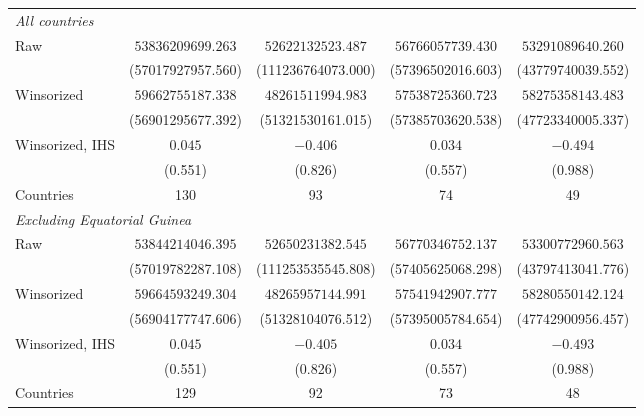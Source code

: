 \begin{table}[htbp]
\begin{tabular}{lcccc}
\multicolumn{5}{l}{\textit{All countries}} \\
Raw & $53836209699.263$ & $52622132523.487$ & $56766057739.430$ & $53291089640.260$ \\
 & (57017927957.560) & (111236764073.000) & (57396502016.603) & (43779740039.552) \\
Winsorized & $59662755187.338$ & $48261511994.983$ & $57538725360.723$ & $58275358143.483$ \\
 & (56901295677.392) & (51321530161.015) & (57385703620.538) & (47723340005.337) \\
Winsorized, IHS & $0.045$ & $-0.406$ & $0.034$ & $-0.494$ \\
 & (0.551) & (0.826) & (0.557) & (0.988) \\
Countries & 130 & 93 & 74 & 49 \\
\multicolumn{5}{l}{\textit{Excluding Equatorial Guinea}} \\
Raw & $53844214046.395$ & $52650231382.545$ & $56770346752.137$ & $53300772960.563$ \\
 & (57019782287.108) & (111253535545.808) & (57405625068.298) & (43797413041.776) \\
Winsorized & $59664593249.304$ & $48265957144.991$ & $57541942907.777$ & $58280550142.124$ \\
 & (56904177747.606) & (51328104076.512) & (57395005784.654) & (47742900956.457) \\
Winsorized, IHS & $0.045$ & $-0.405$ & $0.034$ & $-0.493$ \\
 & (0.551) & (0.826) & (0.557) & (0.988) \\
Countries & 129 & 92 & 73 & 48 \\
\bottomrule
\end{tabular}
\par\vspace{4pt}

\end{table}
